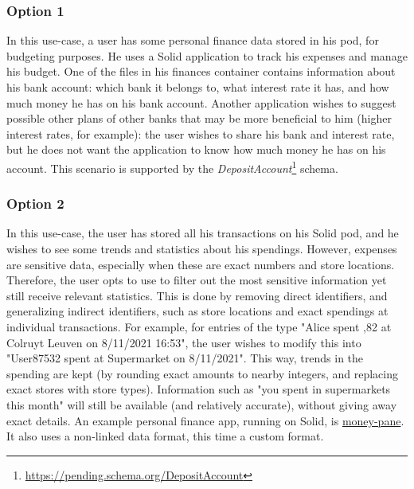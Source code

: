 \subsubsection{Option 1}
In this use-case, a user has some personal finance data stored in his pod, for budgeting purposes. He uses a Solid application to track his expenses and manage his budget. One of the files in his finances container contains information about his bank account: which bank it belongs to, what interest rate it has, and how much money he has on his bank account. Another application wishes to suggest possible other plans of other banks that may be more beneficial to him (higher interest rates, for example): the user wishes to share his bank and interest rate, but he does not want the application to know how much money he has on his account. This scenario is supported by the \textit{DepositAccount}\footnote{\url{https://pending.schema.org/DepositAccount}} schema.


\subsubsection{Option 2}
In this use-case, the user has stored all his transactions on his Solid pod, and he wishes to see some trends and statistics about his spendings. However, expenses are sensitive data, especially when these are exact numbers and store locations. Therefore, the user opts to use \middleware{} to filter out the most sensitive information yet still receive relevant statistics. This is done by removing direct identifiers, and generalizing indirect identifiers, such as store locations and exact spendings at individual transactions.  For example, for entries of the type "Alice spent ,82 at Colruyt Leuven on 8/11/2021 16:53", the user wishes to modify this into "User87532 spent  at Supermarket on 8/11/2021". This way, trends in the spending are kept (by rounding exact amounts to nearby integers, and replacing exact stores with store types). Information such as "you spent  in supermarkets this month" will still be available (and relatively accurate), without giving away exact details. An example personal finance app, running on Solid, is \href{https://github.com/solid/money-pane}{money-pane}. It also uses a non-linked data format, this time a custom format.



